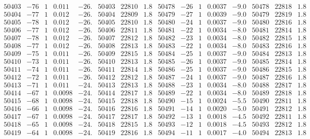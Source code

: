 \documentclass[11pt,reqno,a4letter]{article}
\numberwithin{figure}{section}
\numberwithin{table}{section}
\theoremstyle{plain}
\numberwithin{theorem}{section}
\theoremstyle{definition}
\begin{document}
\begin{table}[ht]
\begin{equation*}
{\begin{array}{ccccc|ccc||ccccc|ccc}
50403 & -76 & 1 & 0.011 & -26. & 50403 & 22810 & 1.8 & 50478 & -26 & 1 & 0.0037 & -9.0 & 50478 & 22818 & 1.8  \\
50404 & -77 & 1 & 0.012 & -26. & 50404 & 22809 & 1.8 & 50479 & -27 & 1 & 0.0039 & -9.0 & 50479 & 22819 & 1.8  \\
50405 & -78 & 1 & 0.012 & -26. & 50405 & 22810 & 1.8 & 50480 & -24 & 1 & 0.0037 & -9.0 & 50480 & 22816 & 1.8  \\
50406 & -77 & 1 & 0.012 & -26. & 50406 & 22811 & 1.8 & 50481 & -22 & 1 & 0.0034 & -8.0 & 50481 & 22814 & 1.8  \\
50407 & -78 & 1 & 0.012 & -26. & 50407 & 22812 & 1.8 & 50482 & -23 & 1 & 0.0034 & -8.0 & 50482 & 22815 & 1.8  \\
50408 & -77 & 1 & 0.012 & -26. & 50408 & 22813 & 1.8 & 50483 & -22 & 1 & 0.0034 & -8.0 & 50483 & 22816 & 1.8  \\
50409 & -75 & 1 & 0.011 & -26. & 50409 & 22815 & 1.8 & 50484 & -25 & 1 & 0.0037 & -9.0 & 50484 & 22813 & 1.8  \\
50410 & -73 & 1 & 0.011 & -26. & 50410 & 22813 & 1.8 & 50485 & -26 & 1 & 0.0037 & -9.0 & 50485 & 22814 & 1.8  \\
50411 & -74 & 1 & 0.011 & -26. & 50411 & 22814 & 1.8 & 50486 & -25 & 1 & 0.0037 & -9.0 & 50486 & 22815 & 1.8  \\
50412 & -72 & 1 & 0.011 & -26. & 50412 & 22812 & 1.8 & 50487 & -24 & 1 & 0.0037 & -9.0 & 50487 & 22816 & 1.8  \\
50413 & -71 & 1 & 0.011 & -24. & 50413 & 22813 & 1.8 & 50488 & -23 & 1 & 0.0034 & -8.0 & 50488 & 22817 & 1.8  \\
50414 & -67 & 1 & 0.0098 & -24. & 50414 & 22817 & 1.8 & 50489 & -22 & 1 & 0.0034 & -8.0 & 50489 & 22818 & 1.8  \\
50415 & -68 & 1 & 0.0098 & -24. & 50415 & 22818 & 1.8 & 50490 & -15 & 1 & 0.0024 & -5.5 & 50490 & 22811 & 1.8  \\
50416 & -66 & 1 & 0.0098 & -24. & 50416 & 22816 & 1.8 & 50491 & -14 & 1 & 0.0020 & -5.0 & 50491 & 22812 & 1.8  \\
50417 & -67 & 1 & 0.0098 & -24. & 50417 & 22817 & 1.8 & 50492 & -13 & 1 & 0.0018 & -4.5 & 50492 & 22811 & 1.8  \\
50418 & -65 & 1 & 0.0098 & -24. & 50418 & 22815 & 1.8 & 50493 & -12 & 1 & 0.0018 & -4.5 & 50493 & 22812 & 1.8  \\
50419 & -64 & 1 & 0.0098 & -24. & 50419 & 22816 & 1.8 & 50494 & -11 & 1 & 0.0017 & -4.0 & 50494 & 22813 & 1.8  \\

\end{array}}
\end{equation*}
\end{table}
\end{document}
